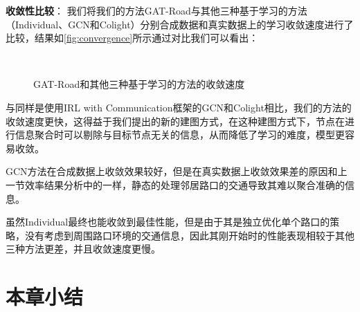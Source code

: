 \textbf{收敛性比较}：
我们将我们的方法GAT-Road与其他三种基于学习的方法（Individual、GCN和Colight）分别合成数据和真实数据上的学习收敛速度进行了比较，结果如\autoref{fig:convergence}所示通过对比我们可以看出：
\begin{figure}[t]
  \quad
  \\
  \quad
  \caption[]{GAT-Road和其他三种基于学习的方法的收敛速度}
  \label{fig:convergence}
\end{figure}
与同样是使用IRL with Communication框架的GCN和Colight相比，我们的方法的收敛速度更快，这得益于我们提出的新的建图方式，在这种建图方式下，节点在进行信息聚合时可以剔除与目标节点无关的信息，从而降低了学习的难度，模型更容易收敛。

GCN方法在合成数据上收敛效果较好，但是在真实数据上收敛效果差的原因和上一节效率结果分析中的一样，静态的处理邻居路口的交通导致其难以聚合准确的信息。

虽然Individual最终也能收敛到最佳性能，但是由于其是独立优化单个路口的策略，没有考虑到周围路口环境的交通信息，因此其刚开始时的性能表现相较于其他三种方法更差，并且收敛速度更慢。


\section{本章小结}